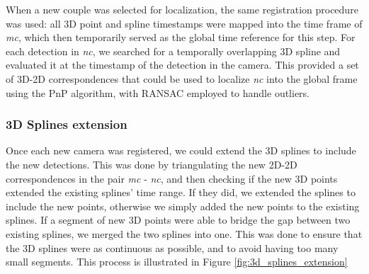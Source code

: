 \documentclass[11pt]{article}
\begin{document}
When a new couple was selected for localization, the same registration procedure was used: all 3D point and spline timestamps were mapped into the time frame of \textit{mc}, which then temporarily served as the global time reference for this step. For each detection in \textit{nc}, we searched for a temporally overlapping 3D spline and evaluated it at the timestamp of the detection in the camera. This provided a set of 3D-2D correspondences that could be used to localize \textit{nc} into the global frame using the PnP algorithm, with RANSAC employed to handle outliers.

\subsubsection{3D Splines extension}

Once each new camera was registered, we could extend the 3D splines to include the new detections. This was done by triangulating the new 2D-2D correspondences in the pair \textit{mc} - \textit{nc}, and then checking if the new 3D points extended the existing splines' time range. If they did, we extended the splines to include the new points, otherwise we simply added the new points to the existing splines. If a segment of new 3D points were able to bridge the gap between two existing splines, we merged the two splines into one. This was done to ensure that the 3D splines were as continuous as possible, and to avoid having too many small segments. This process is illustrated in Figure \ref{fig:3d_splines_extension}
\end{document}
